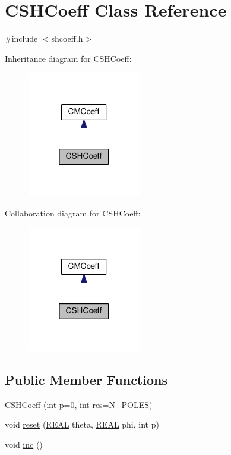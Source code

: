 \hypertarget{classCSHCoeff}{\section{C\-S\-H\-Coeff Class Reference}
\label{classCSHCoeff}
}


{\ttfamily \#include $<$shcoeff.\-h$>$}



Inheritance diagram for C\-S\-H\-Coeff\-:
\nopagebreak
\begin{figure}[H]
\begin{center}
\leavevmode
\includegraphics[width=140pt]{classCSHCoeff__inherit__graph}
\end{center}
\end{figure}


Collaboration diagram for C\-S\-H\-Coeff\-:
\nopagebreak
\begin{figure}[H]
\begin{center}
\leavevmode
\includegraphics[width=140pt]{classCSHCoeff__coll__graph}
\end{center}
\end{figure}
\subsection*{Public Member Functions}
\begin{DoxyCompactItemize}
\item 
\hyperlink{classCSHCoeff_a286a374e16fd7741f869fe5edb1ef9d4}{C\-S\-H\-Coeff} (int p=0, int res=\hyperlink{mcoeff_8h_ac23f9c13c5d07d9ce386f7a830c35e5a}{N\-\_\-\-P\-O\-L\-E\-S})
\item 
void \hyperlink{classCSHCoeff_a7aa1d16fe8a3e18012f2ccaec89a0a0f}{reset} (\hyperlink{util_8h_a5821460e95a0800cf9f24c38915cbbde}{R\-E\-A\-L} theta, \hyperlink{util_8h_a5821460e95a0800cf9f24c38915cbbde}{R\-E\-A\-L} phi, int p)
\item 
void \hyperlink{classCSHCoeff_adf80cf8370b4db9957de7acfe8aa64d6}{inc} ()
\end{DoxyCompactItemize}
